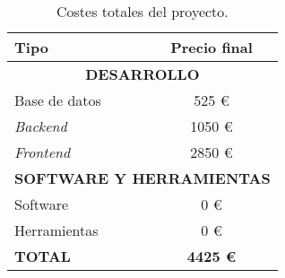 \begin{table}[H]
    \centering
    \begin{tabular}{lc}
        \hline
        \textbf{Tipo}     & \textbf{Precio final}            \\
        \hline \hline
        \multicolumn{2}{c}{\textbf{DESARROLLO}}              \\
        \hline
        Base de datos     & 525 €                            \\
        \textit{Backend}  & 1050 €                           \\
        \textit{Frontend} & 2850 €                           \\
        \hline
        \multicolumn{2}{c}{\textbf{SOFTWARE Y HERRAMIENTAS}} \\
        \hline
        Software          & 0 €                              \\
        Herramientas      & 0 €                              \\
        \hline
        \textbf{TOTAL}    & \textbf{4425 €}                  \\
        \hline
    \end{tabular}
    \caption{Costes totales del proyecto.}
    \label{tab:presupuesto}
\end{table}